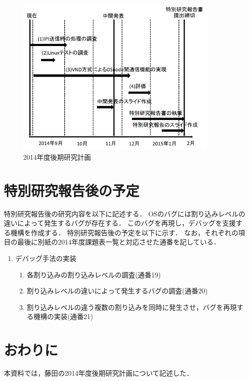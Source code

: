 \documentclass[12pt]{jsarticle}
\begin{document}
\begin{figure}[t]
\begin{center}
\includegraphics[height=8.0cm]{./fig1.jpg}          
\caption{2014年度後期研究計画}
\label{fig:up}
\end{center}
\end{figure}


\section{特別研究報告後の予定}
特別研究報告後の研究内容を以下に記述する．
OSのバグには割り込みレベルの違いによって発生するバグが存在する．
このバグを再現し，デバッグを支援する機構を作成する．
特別研究報告後の予定を以下に示す．
なお，それぞれの項目の最後に別紙の2014年度課題表一覧と対応させた通番を記している．
\begin{enumerate}
\item デバッグ手法の実装
\begin{enumerate}
\item 各割り込みの割り込みレベルの調査(通番19)
\item 割り込みレベルの違いによって発生するバグの調査(通番20)
\item 割り込みレベルの違う複数の割り込みを同時に発生させ，バグを再現する機構の実装(通番21)
\end{enumerate}
\end{enumerate}



\section{おわりに}
本資料では，藤田の2014年度後期研究計画について記述した．
\end{document}
